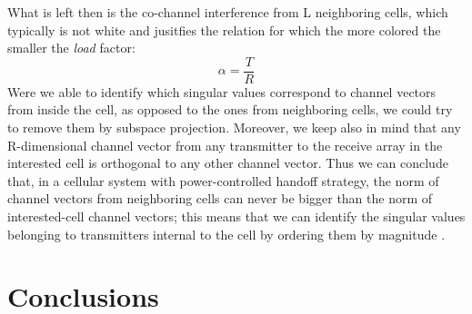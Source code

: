 \documentclass[11pt]{book}
\begin{document}
What is left then is the co-channel interference from L neighboring cells, which typically is not white and jusitfies the relation for which the more colored the smaller the \textit{load} factor:
\begin{equation}
  \alpha = \frac{T}{R}
\end{equation}
Were we able to identify which singular values correspond to channel vectors from inside the cell, as opposed to the ones from neighboring cells, we could try to remove them by subspace projection. Moreover, we keep also in mind that any R-dimensional channel vector from any transmitter to the receive array in the interested cell is orthogonal to any other channel vector. Thus we can conclude that, in a cellular system with power-controlled handoff strategy, the norm of channel vectors from neighboring cells can never be bigger than the norm of interested-cell channel vectors; this means that we can identify the singular values belonging to transmitters internal to the cell by ordering them by magnitude \cite{Ralf}.
\section{Conclusions}


\end{document}
